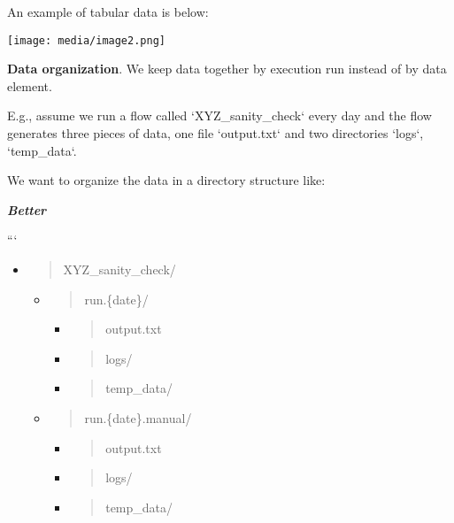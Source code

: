\documentclass[11pt, reqno]{amsart}
\begin{document}
An example of tabular data is below:

\texttt{[image: media/image2.png]}

\textbf{Data organization}. We keep data together by execution run
instead of by data element.

E.g., assume we run a flow called `XYZ\_sanity\_check` every day and the
flow generates three pieces of data, one file `output.txt` and two
directories `logs`, `temp\_data`.

We want to organize the data in a directory structure like:

\emph{\textbf{Better}}

```

\begin{itemize}
\item
  \begin{quote}
  XYZ\_sanity\_check/
  \end{quote}

  \begin{itemize}
  \item
    \begin{quote}
    run.\{date\}/
    \end{quote}

    \begin{itemize}
    \item
      \begin{quote}
      output.txt
      \end{quote}
    \item
      \begin{quote}
      logs/
      \end{quote}
    \item
      \begin{quote}
      temp\_data/
      \end{quote}
    \end{itemize}
  \item
    \begin{quote}
    run.\{date\}.manual/
    \end{quote}

    \begin{itemize}
    \item
      \begin{quote}
      output.txt
      \end{quote}
    \item
      \begin{quote}
      logs/
      \end{quote}
    \item
      \begin{quote}
      temp\_data/
      \end{quote}
    \end{itemize}
  \end{itemize}
\end{itemize}
\end{document}
